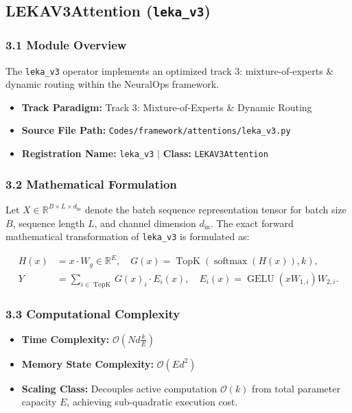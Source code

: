 \subsection{LEKAV3Attention (\texttt{leka\_v3})}
\label{sec:app_module_leka\_v3}

\subsubsection*{3.1 Module Overview}
The \texttt{leka\_v3} operator implements an optimized track 3: mixture-of-experts \& dynamic routing within the NeuralOps framework.
\begin{itemize}
    \item \textbf{Track Paradigm:} Track 3: Mixture-of-Experts & Dynamic Routing
    \item \textbf{Source File Path:} \texttt{Codes/framework/attentions/leka\_v3.py}
    \item \textbf{Registration Name:} \texttt{leka\_v3} $\mid$ \textbf{Class:} \texttt{LEKAV3Attention}
\end{itemize}

\subsubsection*{3.2 Mathematical Formulation}
Let $X \in \mathbb{R}^{B \times L \times d_{\text{in}}}$ denote the batch sequence representation tensor for batch size $B$, sequence length $L$, and channel dimension $d_{\text{in}}$. The exact forward mathematical transformation of \texttt{leka\_v3} is formulated as:

\begin{align}
H(x) &= x \cdot W_g \in \mathbb{R}^{E}, \quad G(x) = \operatorname{TopK}\left(\operatorname{softmax}(H(x)), k\right), \\
Y &= \sum_{i \in \operatorname{TopK}} G(x)_i \cdot E_i(x), \quad E_i(x) = \operatorname{GELU}(x W_{1, i}) W_{2, i}.
\end{align}


\subsubsection*{3.3 Computational Complexity}
\begin{itemize}
    \item \textbf{Time Complexity:} $\mathcal{O}(N d \frac{k}{E})$
    \item \textbf{Memory State Complexity:} $\mathcal{O}(E d^2)$
    \item \textbf{Scaling Class:} Decouples active computation $\mathcal{O}(k)$ from total parameter capacity $E$, achieving sub-quadratic execution cost.
\end{itemize}

